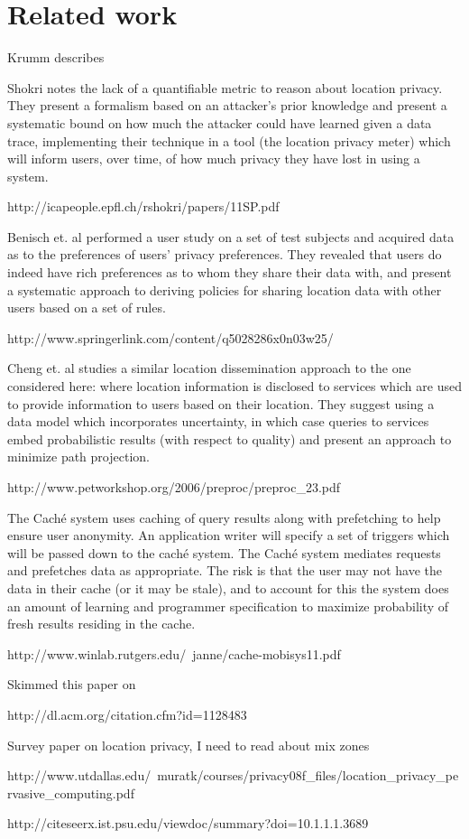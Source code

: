 \section{Related work}

Krumm \cite{krumm:loc_priv_survey} describes 

Shokri \cite{shokri:quantifying_loc_privacy} notes the lack of a
quantifiable metric to reason about location privacy.  They present a
formalism based on an attacker's prior knowledge and present a
systematic bound on how much the attacker could have learned given a
data trace, implementing their technique in a tool (the location
privacy meter) which will inform users, over time, of how much privacy
they have lost in using a system.

http://icapeople.epfl.ch/rshokri/papers/11SP.pdf

Benisch et. al \cite{benisch:capturing_location_priv_prefs} performed
a user study on a set of test subjects and acquired data as to the
preferences of users' privacy preferences.  They revealed that users
do indeed have rich preferences as to whom they share their data with,
and present a systematic approach to deriving policies for sharing
location data with other users based on a set of rules.

http://www.springerlink.com/content/q5028286x0n03w25/

Cheng et. al \cite{cheng:preserving_user_location_privacy} studies a
similar location dissemination approach to the one considered here:
where location information is disclosed to services which are used to
provide information to users based on their location.  They suggest
using a data model which incorporates uncertainty, in which case
queries to services embed probabilistic results (with respect to
quality) and present an approach to minimize path projection.

http://www.petworkshop.org/2006/preproc/preproc_23.pdf

The Cach\'{e} system uses caching of query results along with
prefetching to help ensure user anonymity.  An application writer will
specify a set of triggers which will be passed down to the cach\'{e}
system.  The Cach\'{e} system mediates requests and prefetches data as
appropriate.  The risk is that the user may not have the data in their
cache (or it may be stale), and to account for this the system does an
amount of learning and programmer specification to maximize
probability of fresh results residing in the cache.

http://www.winlab.rutgers.edu/~janne/cache-mobisys11.pdf

Skimmed this paper on

http://dl.acm.org/citation.cfm?id=1128483

Survey paper on location privacy, I need to read about mix zones

http://www.utdallas.edu/~muratk/courses/privacy08f_files/location_privacy_pervasive_computing.pdf

http://citeseerx.ist.psu.edu/viewdoc/summary?doi=10.1.1.1.3689